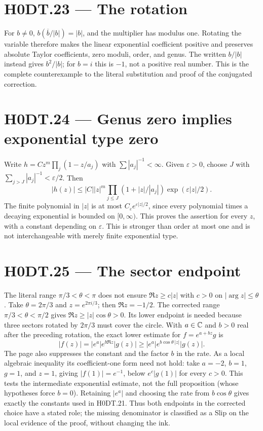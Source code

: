 \section*{H0DT.23 --- The rotation}
For $b\ne0$, $b(\overline b/|b|)=|b|$, and the multiplier has modulus one. Rotating the variable therefore makes the linear exponential coefficient positive and preserves absolute Taylor coefficients, zero moduli, order, and genus. The written $b/|b|$ instead gives $b^2/|b|$; for $b=i$ this is $-1$, not a positive real number. This is the complete counterexample to the literal substitution and proof of the conjugated correction.

\section*{H0DT.24 --- Genus zero implies exponential type zero}
Write $h=Cz^m\prod_j(1-z/a_j)$ with $\sum|a_j|^{-1}<\infty$. Given $\varepsilon>0$, choose $J$ with $\sum_{j>J}|a_j|^{-1}<\varepsilon/2$. Then
\[
 |h(z)|\le |C||z|^m\prod_{j\le J}(1+|z|/|a_j|)\exp(\varepsilon|z|/2).
\]
The finite polynomial in $|z|$ is at most $C_\varepsilon e^{\varepsilon|z|/2}$, since every polynomial times a decaying exponential is bounded on $[0,\infty)$. This proves the assertion for every $z$, with a constant depending on $\varepsilon$. This is stronger than order at most one and is not interchangeable with merely finite exponential type.

\section*{H0DT.25 --- The sector endpoint}
The literal range $\pi/3<\theta<\pi$ does not ensure $\Re z\ge c|z|$ with $c>0$ on $|\arg z|\le\theta$. Take $\theta=2\pi/3$ and $z=e^{2\pi i/3}$; then $\Re z=-1/2$. The corrected range $\pi/3<\theta<\pi/2$ gives $\Re z\ge|z|\cos\theta>0$. Its lower endpoint is needed because three sectors rotated by $2\pi/3$ must cover the circle. With $a\in\mathbb C$ and $b>0$ real after the preceding rotation, the exact lower estimate for $f=e^{a+bz}g$ is
\[
 |f(z)|=|e^a|e^{b\Re z}|g(z)|\ge |e^a|e^{b\cos\theta\,|z|}|g(z)|.
\]
The page also suppresses the constant and the factor $b$ in the rate. As a local algebraic inequality its coefficient-one form need not hold: take $a=-2$, $b=1$, $g=1$, and $z=1$, giving $|f(1)|=e^{-1}$, below $e^c|g(1)|$ for every $c>0$. This tests the intermediate exponential estimate, not the full proposition (whose hypotheses force $b=0$). Retaining $|e^a|$ and choosing the rate from $b\cos\theta$ gives exactly the constants used in H0DT.21. Thus both endpoints in the corrected choice have a stated role; the missing denominator is classified as a Slip on the local evidence of the proof, without changing the ink.

